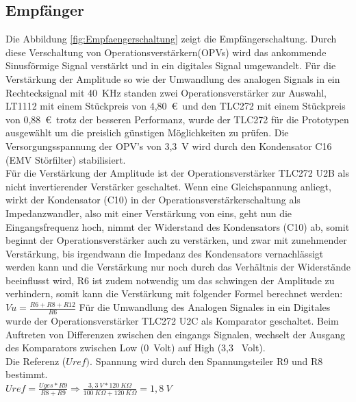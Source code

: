 \subsection{Empfänger}
Die Abbildung \ref{fig:Empfaengerschaltung} zeigt die Empfängerschaltung. Durch diese Verschaltung von Operationsverstärkern(OPVs) wird das ankommende Sinusförmige Signal verstärkt und in ein digitales Signal umgewandelt. 
Für die Verstärkung der Amplitude so wie der Umwandlung des analogen Signals in ein Rechtecksignal mit 40~KHz standen zwei Operationsverstärker zur Auswahl, LT1112 mit einem Stückpreis von 4,80~\euro\ und den TLC272 mit einem Stückpreis von 0,88~\euro\ trotz der besseren Performanz, wurde der TLC272 für die Prototypen ausgewählt um die preislich günstigen Möglichkeiten zu prüfen. Die Versorgungsspannung der OPV's von 3,3~V wird durch den Kondensator C16 (EMV Störfilter) stabilisiert.\\
Für die Verstärkung der Amplitude ist der Operationsverstärker TLC272 U2B als nicht invertierender Verstärker geschaltet.
Wenn eine Gleichspannung anliegt, wirkt der Kondensator (C10) in der Operationsverstärkerschaltung als Impedanzwandler, also mit einer Verstärkung von eins, geht nun die Eingangsfrequenz hoch, nimmt der Widerstand des Kondensators (C10) ab, somit beginnt der Operationsverstärker auch zu verstärken, und zwar mit zunehmender Verstärkung, bis irgendwann die Impedanz des Kondensators vernachlässigt werden kann und die Verstärkung nur noch durch das Verhältnis der Widerstände beeinflusst wird, R6 ist zudem notwendig um das schwingen der Amplitude zu verhindern, somit kann die Verstärkung mit folgender Formel berechnet werden:
\onehalfspacing \\
\(\displaystyle Vu= \frac{ R6+R8+R12}{R6} \) 
\singlespacing
Für die Umwandlung des Analogen Signales in ein Digitales wurde der Operationsverstärker TLC272 U2C als Komparator geschaltet. Beim Auftreten von Differenzen zwischen den eingangs Signalen, wechselt der Ausgang des Komparators zwischen Low (0~Volt) auf High (3,3~ Volt).\\ Die Referenz (\(\displaystyle Uref).\) Spannung wird durch den Spannungsteiler R9 und R8 bestimmt.
\onehalfspacing \\
\(\displaystyle Uref=\frac{Uges*R9}{R8+R9}\Rightarrow\frac{3,3~V*120~K\Omega}{100~K\Omega+120~K\Omega}=1,8~V \)
\singlespacing
